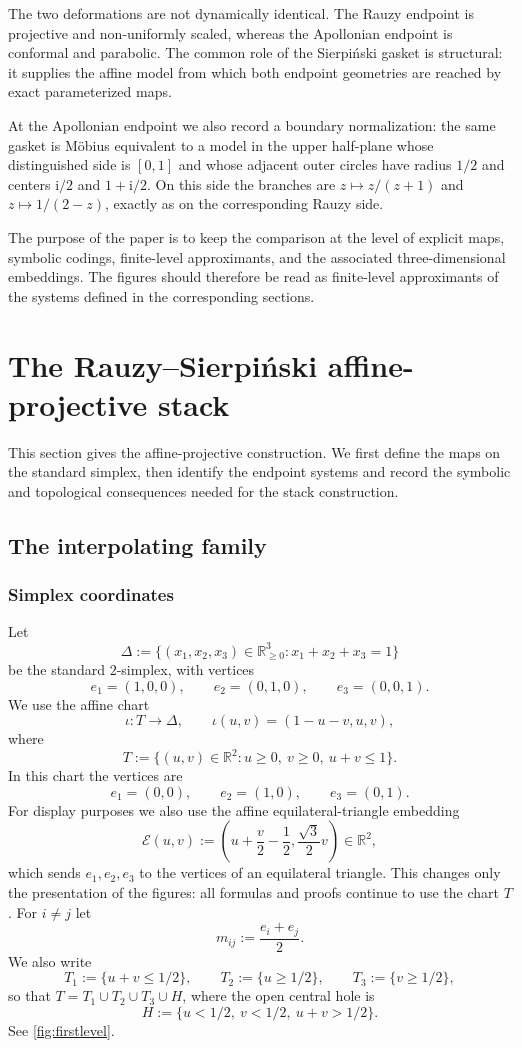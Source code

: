 \documentclass[11pt]{amsart}
\theoremstyle{definition}
\newcommand{\R}{\mathbb{R}}
\newcommand{\D}{\Delta}
\newcommand{\ii}{\mathrm{i}}
\begin{document}
The two deformations are not dynamically identical. The Rauzy endpoint is projective and non-uniformly scaled, whereas the Apollonian endpoint is conformal and parabolic. The common role of the Sierpi\'nski gasket is structural: it supplies the affine model from which both endpoint geometries are reached by exact parameterized maps.

At the Apollonian endpoint we also record a boundary normalization: the same gasket is M\"obius equivalent to a model in the upper half-plane whose distinguished side is $[0,1]$ and whose adjacent outer circles have radius $1/2$ and centers $\ii/2$ and $1+\ii/2$. On this side the branches are $z\mapsto z/(z+1)$ and $z\mapsto1/(2-z)$, exactly as on the corresponding Rauzy side.

The purpose of the paper is to keep the comparison at the level of explicit maps, symbolic codings, finite-level approximants, and the associated three-dimensional embeddings. The figures should therefore be read as finite-level approximants of the systems defined in the corresponding sections.

\section{The Rauzy--Sierpi\'nski affine-projective stack}
This section gives the affine-projective construction. We first define the maps on the standard simplex, then identify the endpoint systems and record the symbolic and topological consequences needed for the stack construction.

\subsection{The interpolating family}

\subsubsection{Simplex coordinates}

Let
\[
\D:=\bigl\{(x_1,x_2,x_3)\in\R_{\ge 0}^3:x_1+x_2+x_3=1\bigr\}
\]
be the standard $2$-simplex, with vertices
\[
 e_1=(1,0,0),\qquad e_2=(0,1,0),\qquad e_3=(0,0,1).
\]
We use the affine chart
\[
\iota:T\to\D,\qquad \iota(u,v)=(1-u-v,u,v),
\]
where
\[
T:=\bigl\{(u,v)\in\R^2:u\ge0,\ v\ge0,\ u+v\le1\bigr\}.
\]
In this chart the vertices are
\[
 e_1=(0,0),\qquad e_2=(1,0),\qquad e_3=(0,1).
\]
For display purposes we also use the affine equilateral-triangle embedding
\[
\mathcal E(u,v):=\left(u+\frac{v}{2}-\frac12,\frac{\sqrt 3}{2}v\right)\in\R^2,
\]
which sends $e_1,e_2,e_3$ to the vertices of an equilateral triangle. This changes only the presentation of the figures: all formulas and proofs continue to use the chart $T$.
For $i\neq j$ let
\[
 m_{ij}:=\frac{e_i+e_j}{2}.
\]
We also write
\[
T_1:=\{u+v\le 1/2\},\qquad T_2:=\{u\ge 1/2\},\qquad T_3:=\{v\ge 1/2\},
\]
so that $T=T_1\cup T_2\cup T_3\cup H$, where the open central hole is
\[
H:=\{u<1/2,\ v<1/2,\ u+v>1/2\}.
\]
See \cref{fig:firstlevel}.
\end{document}
